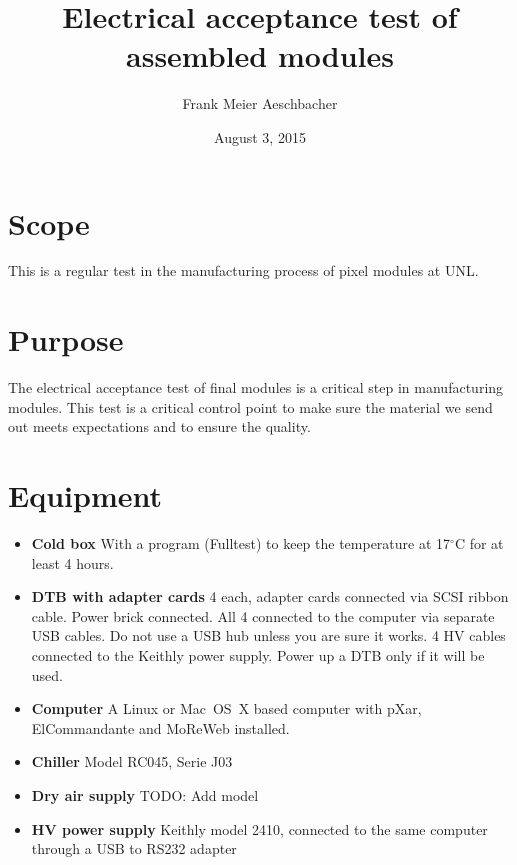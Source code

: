 \documentclass[12pt]{unlsilabsop}
\title{Electrical acceptance test of assembled modules}
\date{August 3, 2015}
\author{Frank Meier Aeschbacher}
\begin{document}
\maketitle

\section{Scope}
This is a regular test in the manufacturing process of pixel modules at UNL.

\section{Purpose}
The electrical acceptance test of final modules is a critical step in manufacturing modules. This test is a critical control point to make sure the material we send out meets expectations and to ensure the quality.



\section{Equipment}

\begin{itemize}
\item \textbf{Cold box}  With a program (Fulltest) to keep the temperature at 17$^\circ$C for at least 4 hours.
\item \textbf{DTB with adapter cards} 4 each, adapter cards connected via SCSI ribbon cable. Power brick connected. All 4 connected to the computer via separate USB cables. Do not use a USB hub unless you are sure it works. 4 HV cables connected to the Keithly power supply. Power up a DTB only if it will be used.
\item \textbf{Computer} A Linux or Mac~OS~X based computer with pXar, ElCommandante and MoReWeb installed.
\item \textbf{Chiller} Model RC045, Serie J03
\item \textbf{Dry air supply} TODO: Add model
\item \textbf{HV power supply} Keithly model 2410, connected to the same computer through a USB to RS232 adapter
\end{itemize}
\end{document}
